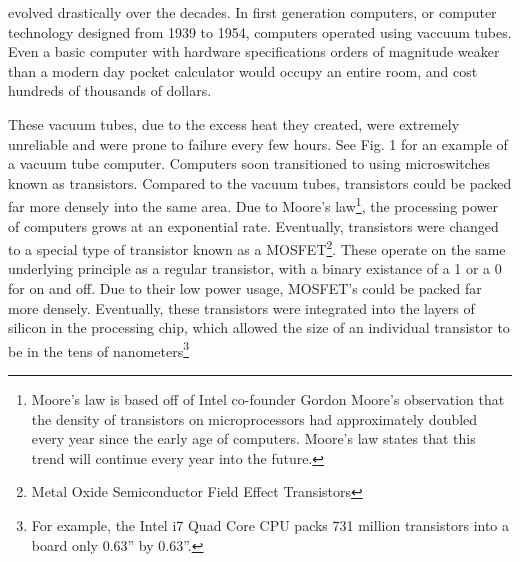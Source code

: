 \documentclass[10pt,journal,compsoc]{IEEEtran}
\begin{document}
 

 evolved drastically over the decades. In first generation computers, or computer technology designed from 1939 to 1954, computers operated using vaccuum tubes. Even a basic computer with hardware specifications orders of magnitude weaker than a modern day pocket calculator would occupy an entire room, and cost hundreds of thousands of dollars\cite{URI}.



These vacuum tubes, due to the excess heat they created, were extremely unreliable and were prone to failure every few hours. See Fig. 1 for an example of a vacuum tube computer. Computers soon transitioned to using microswitches known as transistors.  Compared to the vacuum tubes, transistors could be packed far more densely into the same area. Due to Moore's law\footnote{Moore's law is based off of Intel co-founder Gordon Moore's observation that the density of transistors on microprocessors had approximately doubled every year since the early age of computers. Moore's law states that this trend will continue every year into the future.}, the processing power of computers grows at an exponential rate\cite{Moore}. Eventually, transistors were changed to a special type of transistor known as a MOSFET\footnote{Metal Oxide Semiconductor Field Effect Transistors}. These operate on the same underlying principle as a regular transistor, with a binary existance of a 1 or a 0 for on and off. Due to their low power usage, MOSFET's could be packed far more densely. Eventually, these transistors were integrated into the layers of silicon in the processing chip, which allowed the size of an individual transistor to be in the tens of nanometers\cite{Tom's}\footnote{For example, the Intel i7 Quad Core CPU packs 731 million transistors into a board only 0.63'' by 0.63''\cite{Tom's}.}
\end{document}
